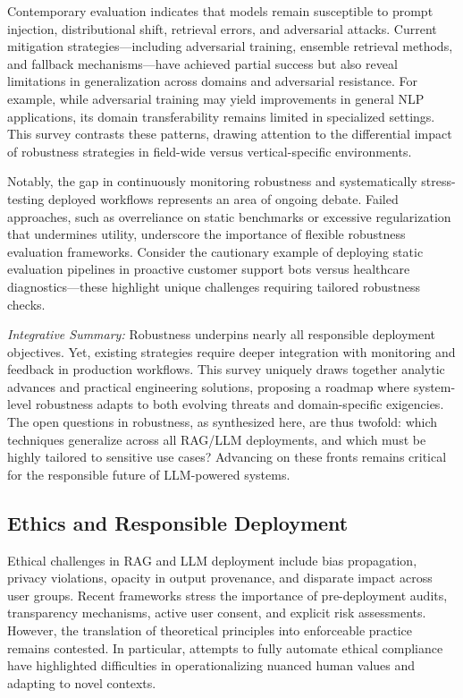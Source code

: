 \documentclass[sigconf]{acmart}
\begin{document}
Contemporary evaluation indicates that models remain susceptible to prompt injection, distributional shift, retrieval errors, and adversarial attacks. Current mitigation strategies—including adversarial training, ensemble retrieval methods, and fallback mechanisms—have achieved partial success but also reveal limitations in generalization across domains and adversarial resistance. For example, while adversarial training may yield improvements in general NLP applications, its domain transferability remains limited in specialized settings. This survey contrasts these patterns, drawing attention to the differential impact of robustness strategies in field-wide versus vertical-specific environments.

Notably, the gap in continuously monitoring robustness and systematically stress-testing deployed workflows represents an area of ongoing debate. Failed approaches, such as overreliance on static benchmarks or excessive regularization that undermines utility, underscore the importance of flexible robustness evaluation frameworks. Consider the cautionary example of deploying static evaluation pipelines in proactive customer support bots versus healthcare diagnostics—these highlight unique challenges requiring tailored robustness checks.

\textit{Integrative Summary:} Robustness underpins nearly all responsible deployment objectives. Yet, existing strategies require deeper integration with monitoring and feedback in production workflows. This survey uniquely draws together analytic advances and practical engineering solutions, proposing a roadmap where system-level robustness adapts to both evolving threats and domain-specific exigencies. The open questions in robustness, as synthesized here, are thus twofold: which techniques generalize across all RAG/LLM deployments, and which must be highly tailored to sensitive use cases? Advancing on these fronts remains critical for the responsible future of LLM-powered systems.

\subsection{Ethics and Responsible Deployment}
Ethical challenges in RAG and LLM deployment include bias propagation, privacy violations, opacity in output provenance, and disparate impact across user groups. Recent frameworks stress the importance of pre-deployment audits, transparency mechanisms, active user consent, and explicit risk assessments. However, the translation of theoretical principles into enforceable practice remains contested. In particular, attempts to fully automate ethical compliance have highlighted difficulties in operationalizing nuanced human values and adapting to novel contexts.
\end{document}
